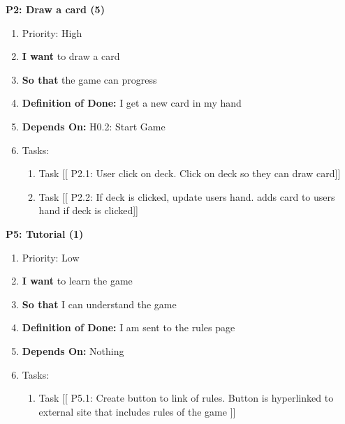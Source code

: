 \textbf{P2: Draw a card (5)}
\begin{enumerate}
    \item Priority: High
    \item \textbf{I want} to draw a card
    \item \textbf{So that} the game can progress
    \item \textbf{Definition of Done:} I get a new card in my hand
    \item \textbf{Depends On:} H0.2: Start Game
    \item Tasks:
    \begin{enumerate}
        \item Task [[ P2.1: User click on deck. Click on deck so they can draw card]]
        \item Task [[ P2.2: If deck is clicked, update users hand. adds card to users hand if deck is clicked]]
    \end{enumerate}
\end{enumerate}

\vspace{2em}

\textbf{P5: Tutorial (1)}
\begin{enumerate}
    \item Priority: Low
    \item \textbf{I want} to learn the game
    \item \textbf{So that} I can understand the game
    \item \textbf{Definition of Done:} I am sent to the rules page
    \item \textbf{Depends On:} Nothing
    \item Tasks:
    \begin{enumerate}
        \item Task [[ P5.1: Create button to link of rules. Button is hyperlinked to external site that includes rules of the game ]]
    \end{enumerate}
\end{enumerate}

\vspace{2em}

